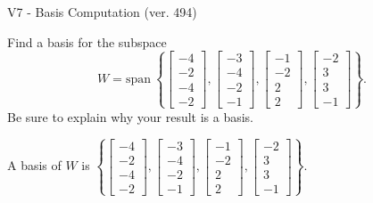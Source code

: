 \begin{exercise}
  \begin{exerciseTitle}V7 - Basis Computation (ver. 494)\end{exerciseTitle}
  \begin{exerciseStatement}
    Find a basis for the subspace 
\[W=\mathrm{span}\ \left\{\left[\begin{array}{r}
-4 \\
-2 \\
-4 \\
-2
\end{array}\right] , \left[\begin{array}{r}
-3 \\
-4 \\
-2 \\
-1
\end{array}\right] , \left[\begin{array}{r}
-1 \\
-2 \\
2 \\
2
\end{array}\right] , \left[\begin{array}{r}
-2 \\
3 \\
3 \\
-1
\end{array}\right]\right\}.\]
 Be sure to explain why your result is a basis.


  \end{exerciseStatement}
  \begin{exerciseAnswer}
   A basis of \(W\) is  \(\left\{\left[\begin{array}{r}
-4 \\
-2 \\
-4 \\
-2
\end{array}\right] , \left[\begin{array}{r}
-3 \\
-4 \\
-2 \\
-1
\end{array}\right] , \left[\begin{array}{r}
-1 \\
-2 \\
2 \\
2
\end{array}\right] , \left[\begin{array}{r}
-2 \\
3 \\
3 \\
-1
\end{array}\right]\right\}\).
  


  \end{exerciseAnswer}
\end{exercise}